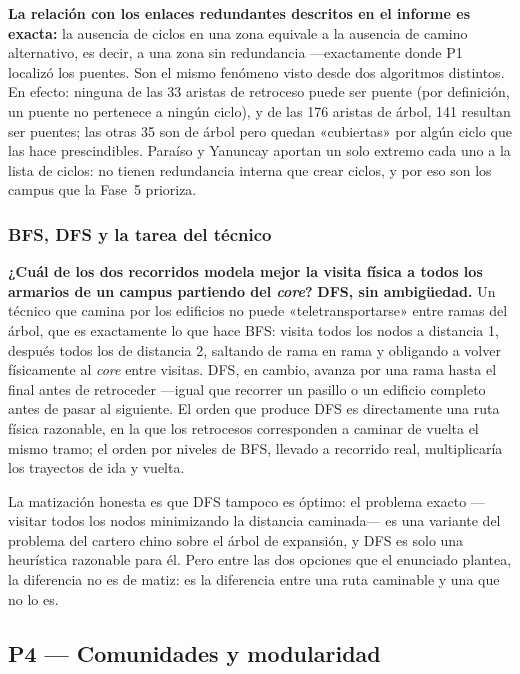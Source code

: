 \documentclass[10pt,a4paper]{extarticle}
\begin{document}
\textbf{La relación con los enlaces redundantes descritos en el informe es exacta:} la
ausencia de ciclos en una zona equivale a la ausencia de camino alternativo, es decir, a
una zona sin redundancia ---exactamente donde P1 localizó los puentes. Son el mismo
fenómeno visto desde dos algoritmos distintos. En efecto: ninguna de las 33 aristas de
retroceso puede ser puente (por definición, un puente no pertenece a ningún ciclo), y de las
176 aristas de árbol, 141 resultan ser puentes; las otras 35 son de árbol pero quedan
«cubiertas» por algún ciclo que las hace prescindibles. Paraíso y Yanuncay aportan un solo
extremo cada uno a la lista de ciclos: no tienen redundancia interna que crear ciclos, y por
eso son los campus que la Fase~5 prioriza.

\subsubsection{BFS, DFS y la tarea del técnico}

\textbf{¿Cuál de los dos recorridos modela mejor la visita física a todos los armarios de un
campus partiendo del \textit{core}?} \textbf{DFS, sin ambigüedad.} Un técnico que camina por
los edificios no puede «teletransportarse» entre ramas del árbol, que es exactamente lo que
hace BFS: visita todos los nodos a distancia 1, después todos los de distancia 2, saltando
de rama en rama y obligando a volver físicamente al \textit{core} entre visitas. DFS, en
cambio, avanza por una rama hasta el final antes de retroceder ---igual que recorrer un
pasillo o un edificio completo antes de pasar al siguiente. El orden que produce DFS es
directamente una ruta física razonable, en la que los retrocesos corresponden a caminar de
vuelta el mismo tramo; el orden por niveles de BFS, llevado a recorrido real, multiplicaría
los trayectos de ida y vuelta.

La matización honesta es que DFS tampoco es óptimo: el problema exacto ---visitar todos los
nodos minimizando la distancia caminada--- es una variante del problema del cartero chino
sobre el árbol de expansión, y DFS es solo una heurística razonable para él. Pero entre las
dos opciones que el enunciado plantea, la diferencia no es de matiz: es la diferencia entre
una ruta caminable y una que no lo es.

\subsection{P4 --- Comunidades y modularidad}
\end{document}

